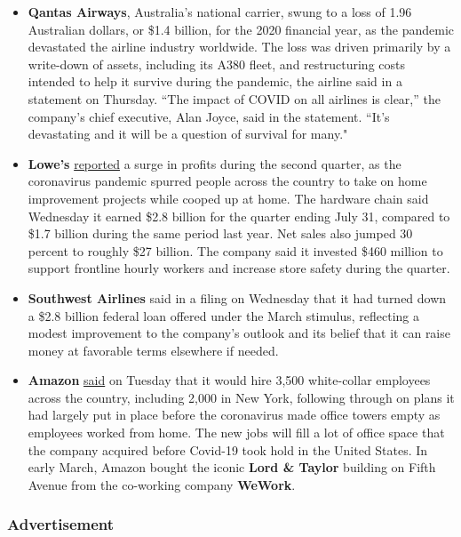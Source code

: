 \begin{itemize}
\item
  \textbf{Qantas Airways}, Australia's national carrier, swung to a loss
  of 1.96 Australian dollars, or \$1.4 billion, for the 2020 financial
  year, as the pandemic devastated the airline industry worldwide. The
  loss was driven primarily by a write-down of assets, including its
  A380 fleet, and restructuring costs intended to help it survive during
  the pandemic, the airline said in a statement on Thursday. ``The
  impact of COVID on all airlines is clear,'' the company's chief
  executive, Alan Joyce, said in the statement. ``It's devastating and
  it will be a question of survival for many."
\item
  \textbf{Lowe's}
  \href{https://corporate.lowes.com/newsroom/press-releases/lowes-reports-second-quarter-2020-sales-and-earnings-results-08-19-20}{reported}
  a surge in profits during the second quarter, as the coronavirus
  pandemic spurred people across the country to take on home improvement
  projects while cooped up at home. The hardware chain said Wednesday it
  earned \$2.8 billion for the quarter ending July 31, compared to \$1.7
  billion during the same period last year. Net sales also jumped 30
  percent to roughly \$27 billion. The company said it invested \$460
  million to support frontline hourly workers and increase store safety
  during the quarter.
\item
  \textbf{Southwest Airlines} said in a filing on Wednesday that it had
  turned down a \$2.8 billion federal loan offered under the March
  stimulus, reflecting a modest improvement to the company's outlook and
  its belief that it can raise money at favorable terms elsewhere if
  needed.
\item
  \textbf{Amazon}
  \href{https://www.nytimes3xbfgragh.onion/2020/08/18/technology/amazon-office-expansion.html}{said}
  on Tuesday that it would hire 3,500 white-collar employees across the
  country, including 2,000 in New York, following through on plans it
  had largely put in place before the coronavirus made office towers
  empty as employees worked from home. The new jobs will fill a lot of
  office space that the company acquired before Covid-19 took hold in
  the United States. In early March, Amazon bought the iconic
  \textbf{Lord \& Taylor} building on Fifth Avenue from the co-working
  company \textbf{WeWork}.
\end{itemize}

\hypertarget{advertisement-2}{%
\subsubsection{Advertisement}\label{advertisement-2}}

